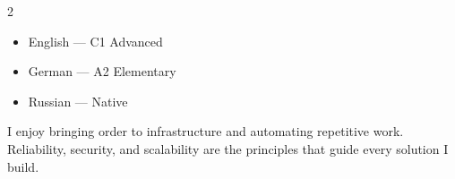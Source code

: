 \documentclass[10pt,a4paper,ragged2e,withhyper]{altacv}
\begin{document}
\begin{paracol}{2}

\divider\smallskip



\divider\smallskip



\divider\smallskip



\divider\smallskip




\begin{itemize}
  \item English --- C1 Advanced
  \item German --- A2 Elementary
  \item Russian --- Native
\end{itemize}


I enjoy bringing order to infrastructure and automating repetitive work. Reliability, security, and scalability are the principles that guide every solution I build.

\end{paracol}
\end{document}
